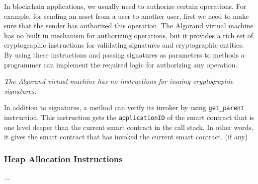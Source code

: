 \documentclass[11pt]{article}
\begin{document}
    In blockchain applications, we usually need to authorize certain operations.
    For example, for sending an asset from a user to another user, first we need to make sure that the sender has
    authorized this operation.
    The Algorand virtual machine has no built in mechanism for authorizing operations, but it provides a rich set of
    cryptographic instructions for validating signatures and cryptographic entities.
    By using these instructions and passing signatures as parameters to methods a programmer can implement the
    required logic for authorizing any operation.

    \emph{The Algorand virtual machine has no instructions for issuing cryptographic signatures.}

    In addition to signatures, a method can verify its invoker by using \texttt{get\_parent} instruction.
    This instruction gets the \texttt{applicationID} of the smart contract that is one level deeper than the current
    smart contract in the call stack.
    In other words, it gives the smart contract that has invoked the current smart contract. (if any)

    \subsubsection{Heap Allocation Instructions}

    ...
\end{document}
